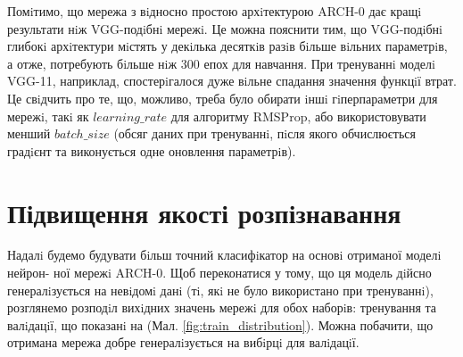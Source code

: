 Помiтимо, що мережа з вiдносно простою архiтектурою ARCH-0 дає кращi результати нiж VGG-подiбнi мережi. Це можна пояснити тим, що VGG-подiбнi глибокi архiтектури мiстять у декiлька десяткiв разiв бiльше вiльних параметрiв, а отже, потребують бiльше нiж 300 епох для навчання. При тренуваннi моделi VGG-11, наприклад, спостерiгалося дуже вiльне спадання значення функцiї втрат. Це свiдчить про те, що, можливо, треба було обирати iншi гiперпараметри для мережi, такi як \(learning\_ rate\) для алгоритму RMSProp, або використовувати менший \(batch\_size\) (обсяг даних при тренуваннi, пiсля якого обчислюється градiєнт та виконується одне оновлення параметрiв).

\section{Підвищення якості розпізнавання}

Надалi будемо будувати бiльш точний класифiкатор на основi отриманої моделi нейрон- ної мережi ARCH-0. Щоб переконатися у тому, що ця модель дiйсно генералiзується на невiдомi данi (тi, якi не було використано при тренуваннi), розглянемо розподiл вихiдних значень мережi для обох наборiв: тренування та валiдацiї, що показанi на (Мал. \ref{fig:train_distribution}). Можна побачити, що отримана мережа добре генералiзується на вибiрцi для валiдацiї.

